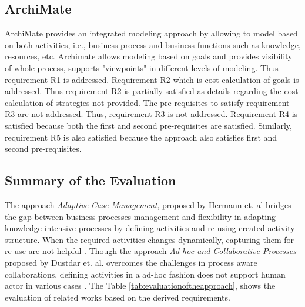 \subsection{ArchiMate}
ArchiMate provides an integrated modeling approach by allowing to model based on both activities, i.e., business process and business functions such as knowledge, resources, etc. Archimate allows modeling based on goals and provides visibility of whole process, supports "viewpoints" in different levels of modeling. Thus requirement R1 is addressed. Requirement R2 which is cost calculation of goals is addressed. Thus requirement R2 is partially satisfied as details regarding the cost calculation of strategies not provided. The pre-requisites to satisfy requirement R3 are not addressed. Thus, requirement R3 is not addressed. Requirement R4 is satisfied because both the first and second pre-requisites are satisfied. Similarly, requirement R5 is also satisfied because the approach also satisfies first and second pre-requisites.  

\subsection {Summary of the Evaluation}
 The approach \textit{Adaptive Case Management}, proposed by Hermann et. al \cite{Herrmann2011} bridges the gap between business processes management and flexibility in adapting knowledge intensive processes by defining activities and re-using created activity structure. When the required activities changes dynamically, capturing them for re-use are not helpful \cite{Sungur2015}. Though the approach \textit{Ad-hoc and Collaborative Processes} proposed by Dustdar et. al. overcomes the challenges in process aware collaborations, defining activities in a ad-hoc fashion does not support human actor in various cases \cite{Sungur2015}. The Table \ref{tab:evaluationoftheapproach}, shows the evaluation of related works based on the derived requirements. 

